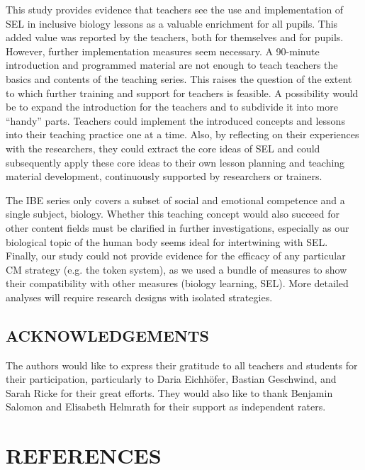 \documentclass[11.5pt]{sig-alternate} %
\begin{document}
\begin{large}
This study provides evidence that teachers see the use and implementation of SEL in inclusive biology lessons as a valuable enrichment for all pupils. This added value was reported by the teachers, both for themselves and for pupils. However, further implementation measures seem necessary. A 90-minute introduction and programmed material are not enough to teach teachers the basics and contents of the teaching series. This raises the question of the extent to which further training and support for teachers is feasible. A possibility would be to expand the introduction for the teachers and to subdivide it into more “handy” parts. Teachers could implement the introduced concepts and lessons into their teaching practice one at a time. Also, by reflecting on their experiences with the researchers, they could extract the core ideas of SEL and could subsequently apply these core ideas to their own lesson planning and teaching material development, continuously supported by researchers or trainers. 

The IBE series only covers a subset of social and emotional competence and a single subject, biology. Whether this teaching concept would also succeed for other content fields must be clarified in further investigations, especially as our biological topic of the human body seems ideal for intertwining with SEL. Finally, our study could not provide evidence for the efficacy of any particular CM strategy (e.g. the token system), as we used a bundle of measures to show their compatibility with other measures (biology learning, SEL). More detailed analyses will require research designs with isolated strategies.

\subsection*{ACKNOWLEDGEMENTS}

The authors would like to express their gratitude to all teachers and students for their participation, particularly to Daria Eichhöfer, Bastian Geschwind, and Sarah Ricke for their great efforts. They would also like to thank Benjamin Salomon and Elisabeth Helmrath for their support as independent raters.


\end{large}
\clearpage
\section*{REFERENCES}\par 
\end{document}
